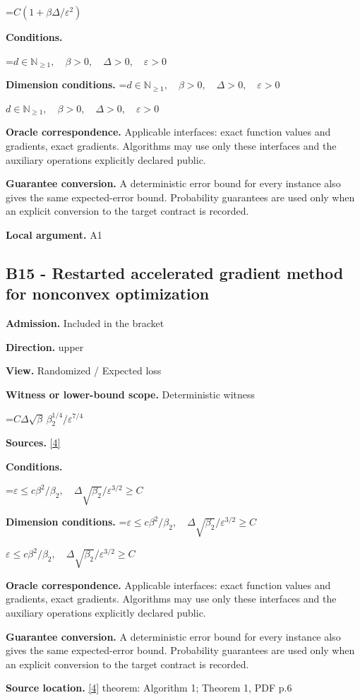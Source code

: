 \documentclass[10pt,a4paper]{article}
\newcommand{\AtlasMath}[1]{\par\begingroup\centering\setbox0=\hbox{$\displaystyle #1$}\ifdim\wd0>1.4\linewidth\typeout{ATLAS WIDE FORMULA: \the\wd0}\fi\ifdim\wd0>\linewidth\resizebox{\linewidth}{!}{\box0}\else\box0\fi\par\endgroup}
\newcommand{\AtlasInlineMath}[1]{\begingroup\setbox0=\hbox{$#1$}\ifdim\wd0>.4\linewidth\endgroup\AtlasMath{#1}\else\endgroup$#1$\fi}
\begin{document}
\AtlasMath{C(1+\beta\Delta/\varepsilon^2)}
\textbf{Conditions.} 
\AtlasMath{d\in\mathbb{N}_{\ge1},\quad \beta>0,\quad \Delta>0,\quad \varepsilon>0}


\textbf{Dimension conditions.} \AtlasInlineMath{d\in\mathbb{N}_{\ge1},\quad \beta>0,\quad \Delta>0,\quad \varepsilon>0}

\textbf{Oracle correspondence.} Applicable interfaces: exact function values and gradients, exact gradients. Algorithms may use only these interfaces and the auxiliary operations explicitly declared public.

\textbf{Guarantee conversion.} A deterministic error bound for every instance also gives the same expected-error bound. Probability guarantees are used only when an explicit conversion to the target contract is recorded.

\textbf{Local argument.} A1

\subsection{B15 - Restarted accelerated gradient method for nonconvex optimization}
\textbf{Admission.} Included in the bracket

\textbf{Direction.} upper

\textbf{View.} Randomized / Expected loss

\textbf{Witness or lower-bound scope.} Deterministic witness

\AtlasMath{C\Delta\sqrt\beta\,\beta_2^{1/4}/\varepsilon^{7/4}}
\textbf{Sources.} \href{https://jmlr.org/papers/volume24/22-0522/22-0522.pdf}{[4]}

\textbf{Conditions.} 
\AtlasMath{\varepsilon\le c\beta^2/\beta_2,\quad\Delta\sqrt{\beta_2}/\varepsilon^{3/2}\ge C}


\textbf{Dimension conditions.} \AtlasInlineMath{\varepsilon\le c\beta^2/\beta_2,\quad\Delta\sqrt{\beta_2}/\varepsilon^{3/2}\ge C}

\textbf{Oracle correspondence.} Applicable interfaces: exact function values and gradients, exact gradients. Algorithms may use only these interfaces and the auxiliary operations explicitly declared public.

\textbf{Guarantee conversion.} A deterministic error bound for every instance also gives the same expected-error bound. Probability guarantees are used only when an explicit conversion to the target contract is recorded.

\textbf{Source location.} \href{https://jmlr.org/papers/volume24/22-0522/22-0522.pdf}{[4]} theorem: Algorithm 1; Theorem 1, PDF p.6
\end{document}
